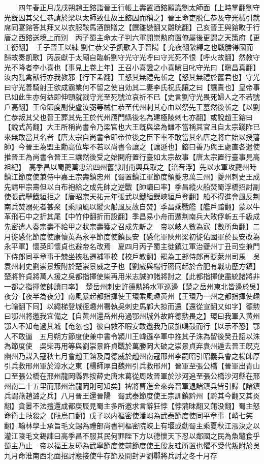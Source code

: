 　　四年春正月戊戌朔趙王鎔詣晉王行帳上壽置酒鎔願識劉太師面【上時掌翻劉守光旣囚其父仁恭請於梁以太師致仕故王鎔因而稱之】晉王命吏脱仁恭及守光械引就席同宴鎔答其拜又以衣服鞍馬酒饌贈之【饌雛戀翻又雛晥翻】己亥晉王與鎔畋于行唐之西鎔送境上而别　丙子蜀主命太子判六軍開崇勲府置僚屬後更謂之天策府【更工衡翻】　壬子晉王以練劉仁恭父子凱歌入于晉陽【充夜翻縶縛之也戰勝得國而歸故奏凱歌】丙辰獻于太廟自臨斬劉守光守光呼曰守光死不恨【呼火故翻】然教守光不降者李小喜也【事見上卷上年】王召小喜證之小喜瞋目叱守光曰【瞋昌真翻】汝内亂禽獸行亦我教邪【行下孟翻】王怒其無禮先斬之【怒其無禮於舊君也】守光曰守光善騎射王欲成霸業何不留之使自効其二妻李氏祝氏讓之曰【讓責也】皇帝事已如此生亦何益即伸頸就戮守光至死號泣哀祈不已【史言劉守光畏死婦人之不若號戶高翻】王命節度副使盧汝弼等械仁恭至代州刺其心血以祭先王墓然後斬之【以劉仁恭叛其父也晉王葬其先王於代州鴈門縣後名為建極陵刺七亦翻】或說趙王鎔曰【說式芮翻】大王所稱尚書令乃梁官也大王旣與梁為讎不當稱其官且自太宗踐阼已來無敢當其名者【唐太宗自尚書令即帝位後之臣下率不敢當其名唐之將亡始以授藩帥】今晉王為盟主勳高位卑不若以尚書令讓之【讓遜也】鎔曰善乃與王處直各遣使推晉王為尚書令晉王三讓然後受之始開府置行臺如太宗故事【唐太宗置行臺事見高祖紀】　高季昌以蜀夔萬忠涪四州舊隸荆南興兵取之【涪音浮】先以水軍攻夔州時鎮江節度使兼侍中嘉王宗壽鎮忠州【蜀置鎮江軍節度領夔忠萬三州】夔州刺史王成先請甲宗壽但以白布袍給之成先帥之逆戰【帥讀曰率】季昌縱火船焚蜀浮橋招討副使張武舉鐵絙拒之【唐昭宗天祐元年張武以鐵絙鏁峽絙戶登翻】船不得進會風反荆南兵焚溺死者甚衆【乘順風以縱火船風反故自焚】季昌乘戰艦【艦戶黯翻】蒙以牛革飛石中之折其尾【中竹仲翻折而設翻】季昌易小舟而遁荆南兵大敗俘斬五千級成先密遣人奏宗壽不給甲之狀宗壽獲之召成先斬之　帝以岐人數為寇【數所角翻】二月徙感化節度使康懷英為永平節度使鎮長安【感化軍陜州梁初徙佑國軍於長安改為永平軍】懷英即懷貞也避帝名改焉　夏四月丙子蜀主徙鎮江軍治夔州丁丑司空兼門下侍郎同平章事于兢坐挾私遷補軍校【校戶教翻】罷為工部侍郎再貶萊州司馬　吳袁州刺史劉崇景叛附於楚崇景威之子也【劉威與楊行密同起於合肥有戰功歷方鎮】楚將許貞將萬人援之吳都指揮使柴再用米志誠帥諸將討之【此都指揮使盡統諸將非一都之指揮使帥讀曰率】　楚岳州刺史許德勲將水軍巡邊【楚之岳州東北皆邊於吳】夜分【夜半為夜分】南風暴起都指揮使王環乘風趣黄州【王環乃一州之都指揮使趣七喻翻下同】以繩梯登城徑趣州署執吳刺史馬鄴大掠而還【還從宣翻又如字】德勲曰鄂州將邀我宜備之【自黄州還岳州舟過鄂州城外故許德勲畏之】環曰我軍入黄州鄂人不知奄過其城【奄忽也】彼自救不暇安敢邀我乃展旗鳴鼓而行【以示不恐】鄂人不敢逼　五月朔方節度使兼中書令潁川王韓遜卒軍中推其子洙為留後癸丑詔以洙為節度使　吳柴再用等與劉崇景許貞戰於萬勝岡大破之崇景貞弃袁州遁去晉王旣克幽州乃謀入寇秋七月會趙王鎔及周德威於趙州南寇邢州李嗣昭引昭義兵會之楊師厚引兵救邢州軍於漳水之東【楊師厚自魏州引兵救邢州】晉軍至張公橋【晉軍出青山口至張公橋在邢州龍岡縣界按薛史唐末葛從周敗晉軍於沙河追至張公橋沙河縣在邢州南二十五里而邢州治龍岡則可知矣】裨將曹進金來奔晉軍退諸鎮兵皆引歸【諸鎮兵謂燕趙潞之兵】八月晉王還晉陽　蜀武泰節度使王宗訓鎮黔州【黔其今翻又其炎翻】貪㬥不法擅還成都庚辰見蜀主多所邀求言辭狂悖【悖蒲昧翻又蒲没翻】蜀主怒命衛士敺殺之【敺烏口翻】戊子以内樞密使潘峭為武泰節度使同平章事【峭七笑翻】翰林學士承旨毛文錫為禮部尚書判樞密院峽上有堰或勸蜀主乘夏秋江漲決之以灌江陵毛文錫諫曰高季昌不服其民何罪陛下方以德懷天下忍以鄰國之民為魚鼈食乎蜀主乃止　帝以福王友璋為武寧節度使前節度使王殷友珪所置也懼不受代叛附於吳九月命淮南西北面招討應接使牛存節及開封尹劉鄩將兵討之冬十月存